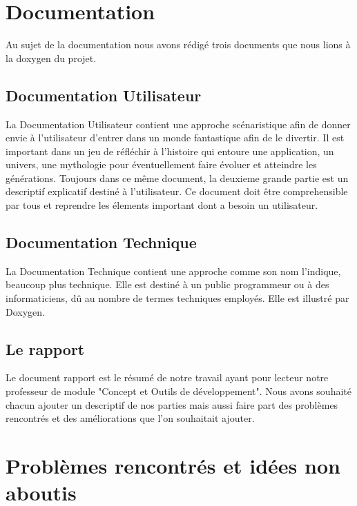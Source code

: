 \documentclass[a4paper 12pts]{article}
\begin{document}
\section{Documentation}


Au sujet de la documentation nous avons rédigé trois documents que nous lions à la doxygen du projet.

\subsection{Documentation Utilisateur}

La Documentation Utilisateur contient une approche scénaristique afin de donner envie à l'utilisateur d'entrer dans un monde fantastique
afin de le divertir. Il est important dans un jeu de réfléchir à l'histoire qui entoure une application, un univers, une mythologie pour éventuellement
faire évoluer et atteindre les générations.
Toujours dans ce même document, la deuxieme grande partie est un descriptif explicatif destiné à l'utilisateur.
Ce document doit être comprehensible par tous et reprendre les élements important dont a besoin un utilisateur.

\subsection{Documentation Technique}

La Documentation Technique contient une approche comme son nom l'indique, beaucoup plus technique. Elle est destiné à un public programmeur
ou à des informaticiens, dû au nombre de termes techniques employés.
Elle est illustré par Doxygen.

\subsection{Le rapport}

Le document rapport est le résumé de notre travail ayant pour lecteur notre professeur de module "Concept et Outils de développement".
Nous avons souhaité chacun ajouter un descriptif de nos parties mais aussi faire part des problèmes rencontrés et des améliorations que l'on souhaitait ajouter.

\newpage
\section{Problèmes rencontrés et idées non aboutis}
\end{document}

